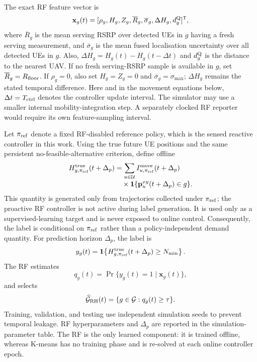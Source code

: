 The exact RF feature vector is
\begin{equation}
 \mathbf{x}_g(t)=
 [\rho_g,H_g,Z_g,\overline{R}_g,
 \overline{\sigma}_g,\Delta H_g,d_g^{\rm Q}]^{\mathsf T},
 \label{eq:rf-features-compact}
\end{equation}
where $\overline{R}_g$ is the mean serving RSRP over detected UEs in
$g$ having a fresh serving measurement, and $\overline{\sigma}_g$ is
the mean fused localisation uncertainty over all detected UEs in
$g$. Also, $\Delta H_g=H_g(t)-H_g(t-\Delta t)$ and $d_g^{\rm Q}$ is
the distance to the nearest UAV. If no fresh serving-RSRP sample is
available in $g$, set $\overline{R}_g=R_{\rm floor}$. If $\rho_g=0$,
also set $H_g=Z_g=0$ and
$\overline{\sigma}_g=\sigma_{\max}$; $\Delta H_g$ remains the stated
temporal difference.
Here and in the movement equations below, $\Delta t=T_{\rm ctrl}$
denotes the controller update interval. The simulator may use a
smaller internal mobility-integration step. A separately clocked RF
reporter would require its own feature-sampling interval.

Let $\pi_{\rm ref}$ denote a fixed RF-disabled reference policy,
which is the sensed reactive controller in this work. Using the true
future UE positions and the same persistent no-feasible-alternative
criterion, define offline
\begin{equation}
 \begin{aligned}
 H_{g,\pi_{\rm ref}}^{\rm true}(t+\Delta_p)
 &=\sum_{u\in\mathcal{U}}
 I_{u,\pi_{\rm ref}}^{\rm move}(t+\Delta_p)\\[-1mm]
 &\quad\times
 \mathbf{1}\{\mathbf{p}^{xy}_u(t+\Delta_p)\in g\}.
 \end{aligned}
 \label{eq:true-future-hotspot}
\end{equation}
This quantity is generated only from trajectories collected under
$\pi_{\rm ref}$; the proactive RF controller is not active during
label generation. It is used only as a supervised-learning target
and is never exposed to online control. Consequently, the label is
conditional on $\pi_{\rm ref}$ rather than a policy-independent
demand quantity. For prediction horizon
$\Delta_p$, the label is
\begin{equation}
 y_g(t)=\mathbf{1}\!\left\{
 H_{g,\pi_{\rm ref}}^{\rm true}(t+\Delta_p)
 \geq N_{\min}\right\}.
 \label{eq:rf-label-compact}
\end{equation}
The RF estimates
\begin{equation}
 q_g(t)=\Pr\{y_g(t)=1\mid\mathbf{x}_g(t)\},
 \label{eq:rf-probability}
\end{equation}
and selects
\begin{equation}
 \widehat{\mathcal{G}}_{\rm RH}(t)=
 \{g\in\mathcal{G}:q_g(t)\geq\tau\}.
 \label{eq:predicted-hotspots}
\end{equation}
Training, validation, and testing use independent simulation seeds
to prevent temporal leakage. RF hyperparameters and $\Delta_p$ are
reported in the simulation-parameter table.
The RF is the only learned component: it is trained offline, whereas
K-means has no training phase and is re-solved at each online
controller epoch.

